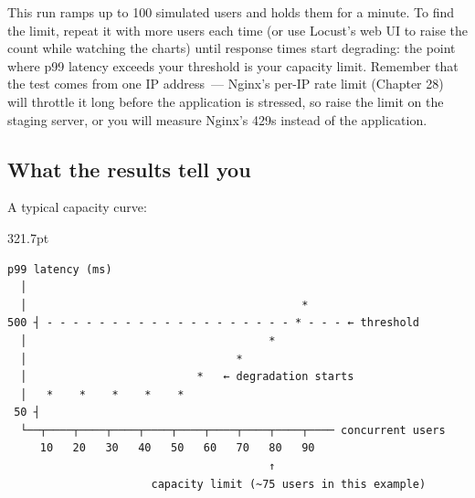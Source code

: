 \begin{codebox}[short]

\begin{Shaded}
\begin{Highlighting}[]
 \DataTypeTok{\textbackslash{}}
\end{Highlighting}
\end{Shaded}

\end{codebox}

\noindent{}This run ramps up to 100 simulated users and holds them for a minute. To find the limit, repeat it with more users each time (or use Locust's web UI to raise the count while watching the charts) until response times start degrading: the point where p99 latency exceeds your threshold is your capacity limit. Remember that the test comes from one IP address~--- Nginx's per-IP rate limit (Chapter 28) will throttle it long before the application is stressed, so raise the limit on the staging server, or you will measure Nginx's 429s instead of the application.

\subsection*{What the results tell you}\label{36-scaling-load:what-the-results-tell-you}

A typical capacity curve:

\begin{diagrambox}[short]{321.7pt}
\begin{Verbatim}[fontsize=\fontsize{9.0}{8.55}\selectfont]
p99 latency (ms)
  │
  │                                          *
500 ┤ - - - - - - - - - - - - - - - - - - - * - - - ← threshold
  │                                     *
  │                                *
  │                          *   ← degradation starts
  │   *    *    *    *    *
 50 ┤
  └──┬────┬────┬────┬────┬────┬────┬────┬────┬──── concurrent users
     10   20   30   40   50   60   70   80   90
                                        ↑
                      capacity limit (~75 users in this example)
\end{Verbatim}
\end{diagrambox}

